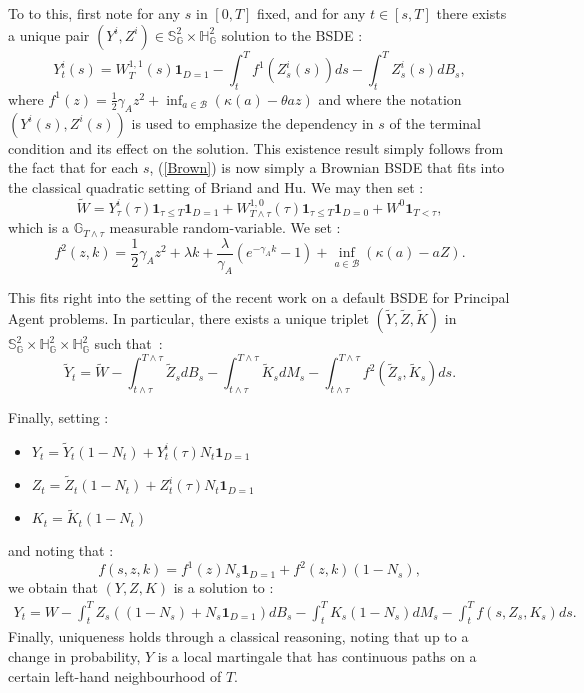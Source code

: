 \documentclass[numbook, envcountsect, envcountsame, envcountreset, runningheads, smallextended]{article}
\begin{document}
To to this, first note for any $s$ in $[0,T]$ fixed, and for any $t \in [s, T]$ there exists a unique pair $(Y^{i}, Z^{i}) \in \mathbb{S}^{2}_{\mathbb{G}}\times \mathbb{H}^{2}_{\mathbb{G}}$ solution to the BSDE : 
\begin{equation}
\label{Brown}
 Y^i_t(s)  = W_T^{1,1}(s)\textbf{1}_{D=1} - \int_t^T f^{1}(Z_s^{i}(s)) ds - \int_t^T Z_s^i(s) dB_s, 
 \end{equation}
where $f^{1}(z) = \frac{1}{2}\gamma_A z^2 + \inf_{a \in \mathcal{B}}(\kappa(a) - \theta a z)$ and where the notation $(Y^i(s), Z^i(s))$ is used to emphasize the dependency in $s$ of the terminal condition and its effect on the solution.  This existence result simply follows from the fact that for each $s$, (\ref{Brown}) is now simply a Brownian BSDE that fits into the classical quadratic setting of Briand and Hu. We may then set : 
$$ \tilde{W} = Y_\tau^i(\tau) \textbf{1}_{\tau \leq T} \textbf{1}_{D=1} + W^{1, 0}_{T \wedge \tau}(\tau) \textbf{1}_{\tau \leq T} \textbf{1}_{D=0} + W^{0} \textbf{1}_{T < \tau},$$
which is a $\mathbb{G}_{T \wedge \tau}$ measurable random-variable. We set : 
$$ f^{2}(z,k) = \frac{1}{2}\gamma_A z^2  +  \lambda k + \frac{\lambda}{\gamma_A} (e^{-\gamma_A k}-1) + \inf_{a \in \mathcal{B}}\left( \kappa(a)- aZ\right).$$

This fits right into the setting of the recent work \cite{Martin2020} on a default BSDE for Principal Agent problems. In particular, there exists a unique triplet $(\tilde{Y}, \tilde{Z}, \tilde{K} )$ in $ \mathbb{S}^{2}_{\mathbb{G}}\times \mathbb{H}^{2}_{\mathbb{G}} \times \mathbb{H}^{2}_{\mathbb{G}}$ such that~: 
$$ \tilde{Y}_t = \tilde{W} - \int_{t \wedge \tau}^{T \wedge \tau} \tilde{Z}_s dB_s -   \int_{t \wedge \tau}^{T \wedge \tau} \tilde{K}_s dM_s  - \int_{t \wedge \tau}^{T \wedge \tau} f^2(\tilde{Z}_s, \tilde{K}_s) ds. $$

Finally, setting : 
\begin{itemize}
\item $Y_t = \tilde{Y}_t (1-N_t) + Y^{i}_t(\tau) N_t \textbf{1}_{D=1}$
\item $Z_t = \tilde{Z}_t (1-N_t) + Z^{i}_t(\tau) N_t \textbf{1}_{D=1}$
\item $K_t = \tilde{K}_t (1-N_t)$
\end{itemize}
and noting that : 
$$ f(s, z,k) = f^{1}(z)N_s \textbf{1}_{D=1} + f^{2}(z,k)(1-N_s),$$
we obtain that $(Y,Z,K)$ is a solution to : 
\begin{align} 
\label{BS}Y_t = W - \int_t^T Z_s((1-N_s) + N_s \textbf{1}_{D=1})dB_s - \int_t^T K_s(1-N_s) dM_s - \int_t^T f(s, Z_s, K_s) ds.
\end{align}
Finally, uniqueness holds through a classical reasoning, noting that up to a change in probability, $Y$ is a local martingale that has continuous paths on a certain left-hand neighbourhood of $T$. 
\end{document}
